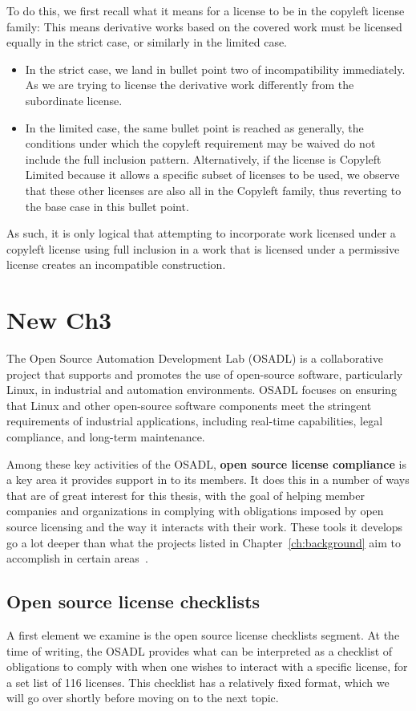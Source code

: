To do this, we first recall what it means for a license to be in the copyleft license family: This means derivative works based on the covered work must be licensed equally in the strict case, or similarly in the limited case.
\begin{itemize}
	\item In the strict case, we land in bullet point two of incompatibility immediately. As we are trying to license the derivative work differently from the subordinate license.
	\item In the limited case, the same bullet point is reached as generally, the conditions under which the copyleft requirement may be waived do not include the full inclusion pattern. Alternatively, if the license is Copyleft Limited because it allows a specific subset of licenses to be used, we observe that these other licenses are also all in the Copyleft family, thus reverting to the base case in this bullet point.
\end{itemize}

As such, it is only logical that attempting to incorporate work licensed under a copyleft license using full inclusion in a work that is licensed under a permissive license creates an incompatible construction.

\chapter{New Ch3}

The Open Source Automation Development Lab (OSADL) is a collaborative project that supports and promotes the use of open-source software, particularly Linux, in industrial and automation environments. OSADL focuses on ensuring that Linux and other open-source software components meet the stringent requirements of industrial applications, including real-time capabilities, legal compliance, and long-term maintenance.

Among these key activities of the OSADL, \textbf{open source license compliance} is a key area it provides support in to its members. It does this in a number of ways that are of great interest for this thesis, with the goal of helping member companies and organizations in complying with obligations imposed by open source licensing and the way it interacts with their work. These tools it develops go a lot deeper than what the projects listed in Chapter~\ref{ch:background} aim to accomplish in certain areas~\cite{osadl-home}.

\section{Open source license checklists}

A first element we examine is the open source license checklists segment. At the time of writing, the OSADL provides what can be interpreted as a checklist of obligations to comply with when one wishes to interact with a specific license, for a set list of 116 licenses. This checklist has a relatively fixed format, which we will go over shortly before moving on to the next topic.
